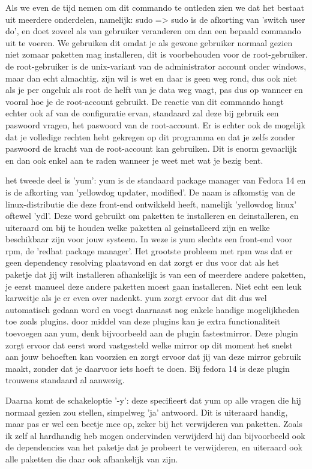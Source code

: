 Als we even de tijd nemen om dit commando te ontleden zien we dat het bestaat uit meerdere onderdelen, namelijk: sudo => sudo is de afkorting van 'switch user do', en doet zoveel als van gebruiker veranderen om dan een bepaald commando uit te voeren. We gebruiken dit omdat je als gewone gebruiker normaal gezien niet zomaar paketten mag installeren, dit is voorbehouden voor de root-gebruiker. de root-gebruiker is de unix-variant van de administrator account onder windows, maar dan echt almachtig. zijn wil is wet en daar is geen weg rond, dus ook niet als je per ongeluk als root de helft van je data weg vaagt, pas dus op wanneer en vooral hoe je de root-account gebruikt. De reactie van dit commando hangt echter ook af van de configuratie ervan, standaard zal deze bij gebruik een paswoord vragen, het paswoord van de root-account. Er is echter ook de mogelijk dat je volledige rechten hebt gekregen op dit programma en dat je zelfs zonder paswoord de kracht van de root-account kan gebruiken. Dit is enorm gevaarlijk en dan ook enkel aan te raden wanneer je weet met wat je bezig bent.

het tweede deel is 'yum': yum is de standaard package manager van Fedora 14 en is de afkorting van 'yellowdog updater, modified'. De naam is afkomstig van de linux-distributie die deze front-end ontwikkeld heeft, namelijk 'yellowdog linux' oftewel 'ydl'. Deze word gebruikt om paketten te installeren en deinstalleren, en uiteraard om bij te houden welke paketten al geinstalleerd zijn en welke beschikbaar zijn voor jouw systeem. In weze is yum slechts een front-end voor rpm, de 'redhat package manager'. Het grootste probleem met rpm was dat er geen dependency resolving plaatsvond en dat zorgt er dus voor dat als het paketje dat jij wilt installeren afhankelijk is van een of meerdere andere paketten, je eerst manueel deze andere paketten moest gaan installeren. Niet  echt een leuk karweitje als je er even over nadenkt. yum zorgt ervoor dat dit dus wel automatisch gedaan word en voegt daarnaast nog enkele handige mogelijkheden toe zoals plugins. door middel van deze plugins kan je extra functionaliteit toevoegen aan yum, denk bijvoorbeeld aan de plugin fastestmirror. Deze plugin zorgt ervoor dat eerst word vastgesteld welke mirror op dit moment het snelst aan jouw behoeften kan voorzien en zorgt ervoor dat jij van deze mirror gebruik maakt, zonder dat je daarvoor iets hoeft te doen. Bij fedora 14 is deze plugin trouwens standaard al aanwezig.

Daarna komt de schakeloptie '-y': deze specifieert dat yum op alle vragen die hij normaal gezien zou stellen, simpelweg 'ja' antwoord. Dit is uiteraard handig, maar pas er wel een beetje mee op, zeker bij het verwijderen van paketten. Zoals ik zelf al hardhandig heb mogen ondervinden verwijderd hij dan bijvoorbeeld ook de dependencies van het paketje dat je probeert te verwijderen, en uiteraard ook alle paketten die daar ook afhankelijk van zijn. 

